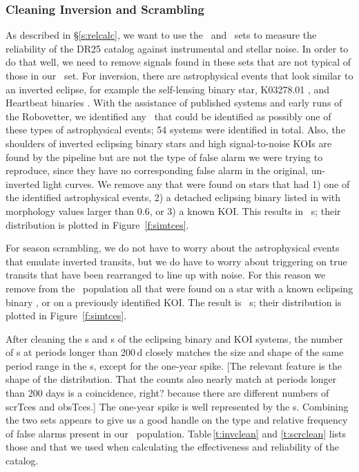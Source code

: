 \subsubsection{Cleaning Inversion and Scrambling}
\label{s:clean}
As described in \S\ref{s:relcalc}, we want to use the \invtce\ and \scrtce\ sets to measure the reliability of the DR25 catalog against instrumental and stellar noise. In order to do that well, we need to remove signals found in these sets that are not typical of those in our \opstce\ set. For inversion, there are astrophysical events that look similar to an inverted eclipse, for example the self-lensing binary star, K03278.01 \citep{Kruse2014}, and Heartbeat binaries \citep{Thompson2012}. With the assistance of published systems and early runs of the Robovetter, we identified any \invtce\ that could be identified as possibly one of these types of astrophysical events; 54 systems were identified in total. Also, the shoulders of inverted eclipsing binary stars and high signal-to-noise KOIs are found by the pipeline but are not the type of false alarm we were trying to reproduce, since they have no corresponding false alarm in the original, un-inverted light curves. We remove any  that were found on stars that had 1) one of the identified astrophysical events, 2) a detached eclipsing binary listed in \citet{Kirk2016} with morphology values larger than 0.6, or 3) a known KOI.  This results in \ninvtces\ \invtce s; their distribution is plotted in Figure~\ref{f:simtces}.

For season scrambling, we do not have to worry about the astrophysical events that emulate inverted transits, but we do have to worry about triggering on true transits that have been rearranged to line up with noise. For this reason we remove from the \scrtce\ population all that were found on a star with a known eclipsing binary \citep{Kirk2016}, or on a previously identified KOI. The result is \nscrtces\ \scrtce s; their distribution is plotted in Figure~\ref{f:simtces}. 

After cleaning the \invtce s and \scrtce s of the eclipsing binary and KOI systems, the number of \scrtce s at periods longer than 200\,d closely matches the size and shape of the same period range in the \opstce s, except for the one-year spike.  [The relevant feature is the shape of the distribution. That the counts also nearly  match at periods longer than 200 days is a coincidence, right? because there are different numbers of scrTces and obsTces.] The one-year spike is well represented by the \invtce s.  Combining the two sets appears to give us a good handle on the type and relative frequency of false alarms present in our \opstce\ population. Table\,\ref{t:invclean} and \ref{t:scrclean} lists those  and  that we used when calculating the effectiveness and reliability of the catalog.




